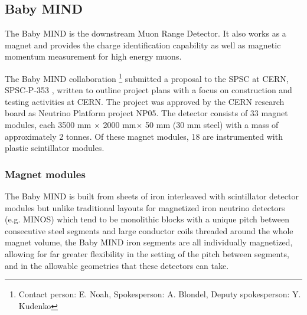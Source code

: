 \subsection{Baby MIND}
The Baby MIND is the downstream Muon Range Detector.
It also works as a magnet and provides the charge identification capability
as well as magnetic momentum measurement for high energy muons.

The Baby MIND collaboration \footnote{Contact person: E. Noah, Spokesperson: A. Blondel, Deputy spokesperson: Y. Kudenko} submitted a proposal to the SPSC at CERN, SPSC-P-353 \cite{spsc:babymind}, written to outline project plans with a focus on construction and testing activities at CERN. The project was approved by the CERN research board as Neutrino Platform project NP05.
The detector consists of 33 magnet modules, each 3500 mm $\times$ 2000 mm$ \times$ 50 mm (30 mm steel) with a mass of approximately 2 tonnes. Of these magnet modules, 18 are instrumented with plastic scintillator modules. 




\subsubsection{Magnet modules}

The Baby MIND is built from sheets of iron interleaved with scintillator detector modules but unlike traditional layouts for magnetized iron neutrino detectors (e.g. MINOS) which tend to be monolithic blocks with a unique pitch between consecutive steel segments and large conductor coils threaded around the whole magnet volume, the Baby MIND iron segments are all individually magnetized, allowing for far greater flexibility in the setting of the pitch between segments, and in the allowable geometries that these detectors can take. 

